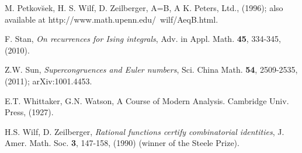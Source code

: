 \documentclass[12pt,a4paper]{amsart}
\begin{document}
\begin{thebibliography}{99}
 M. Petkov\u{s}ek, H. S. Wilf, D. Zeilberger, A=B, A K. Peters, Ltd., (1996);
also available at http://www.math.upenn.edu/~wilf/AeqB.html.

 F. Stan, {\it On recurrences for Ising integrals}, Adv. in Appl. Math.  \textbf{45}, 334-345, (2010).

 Z.W. Sun, {\it Supercongruences and Euler numbers}, Sci. China Math. \textbf{54}, 2509-2535, (2011); arXiv:1001.4453.

 E.T. Whittaker, G.N. Watson, A Course of Modern Analysis. Cambridge Univ. Press, (1927).

 H.S. Wilf, D. Zeilberger, {\it Rational functions certify combinatorial identities},
J. Amer. Math. Soc. \textbf{3}, 147-158, (1990) (winner of the Steele Prize).

\end{thebibliography}

\vskip 0.35cm
\end{document}
